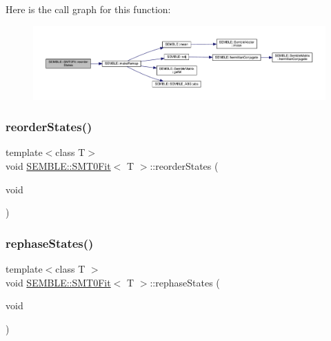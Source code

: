 Here is the call graph for this function\+:
\nopagebreak
\begin{figure}[H]
\begin{center}
\leavevmode
\includegraphics[width=350pt]{d6/dad/structSEMBLE_1_1SMT0Fit_a173df18017871b3d27ae10eb16422224_cgraph}
\end{center}
\end{figure}
\mbox{\label{structSEMBLE_1_1SMT0Fit_a173df18017871b3d27ae10eb16422224}} 
\subsubsection{\texorpdfstring{reorderStates()}{reorderStates()}\hspace{0.1cm}{\footnotesize\ttfamily [2/2]}}
{\footnotesize\ttfamily template$<$class T$>$ \\
void \mbox{\hyperlink{structSEMBLE_1_1SMT0Fit}{S\+E\+M\+B\+L\+E\+::\+S\+M\+T0\+Fit}}$<$ T $>$\+::reorder\+States (\begin{DoxyParamCaption}\item[{void}]{ }\end{DoxyParamCaption})}

\mbox{\label{structSEMBLE_1_1SMT0Fit_ae6cc499f68d4bdb3b9c355fcde7905f7}} 
\subsubsection{\texorpdfstring{rephaseStates()}{rephaseStates()}\hspace{0.1cm}{\footnotesize\ttfamily [1/2]}}
{\footnotesize\ttfamily template$<$class T $>$ \\
void \mbox{\hyperlink{structSEMBLE_1_1SMT0Fit}{S\+E\+M\+B\+L\+E\+::\+S\+M\+T0\+Fit}}$<$ T $>$\+::rephase\+States (\begin{DoxyParamCaption}\item[{void}]{ }\end{DoxyParamCaption})}

